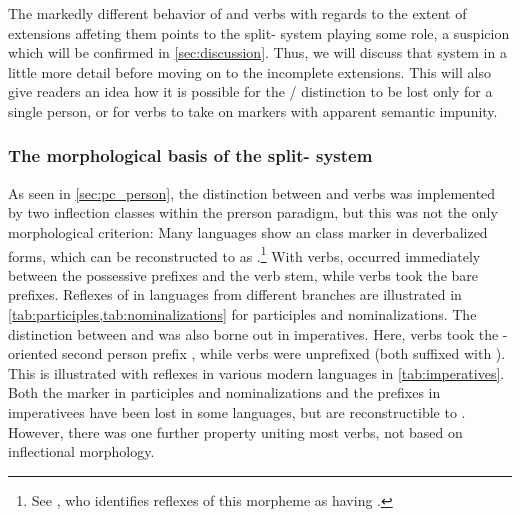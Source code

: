 The markedly different behavior of  and  verbs with regards to the extent of extensions affeting them points to the split- system playing some role, a suspicion which will be confirmed in \cref{sec:discussion}.
Thus, we will discuss that system in a little more detail before moving on to the incomplete extensions.
This will also give readers an idea how it is possible for the / distinction to be lost only for a single person, or for  verbs to take on  markers with apparent semantic impunity.



\subsubsection{The morphological basis of the split- system}
\label{sec:split}
As seen in \cref{sec:pc_person}, the \PC distinction between  and  verbs was implemented by two inflection classes within the \setone prerson paradigm, but this was not the only morphological criterion:
%
Many languages show an  class marker in deverbalized forms, which can be reconstructed to \PC as .\footnote{See \textcite[227]{meira2000split}, who identifies reflexes of this morpheme as having .}
With  verbs,  occurred immediately between the possessive prefixes and the verb stem, while  verbs took the bare prefixes.
Reflexes of  in languages from different branches are illustrated in \cref{tab:participles,tab:nominalizations} for participles and nominalizations.%
%
%
%
%
%
The distinction between  and  was also borne out in imperatives.
Here,  verbs took the -oriented second person prefix , while  verbs were unprefixed (both suffixed with ).
This is illustrated with reflexes in various modern languages in \cref{tab:imperatives}.
Both the  marker  in participles and nominalizations and the prefixes in imperativees have been lost in some languages, but are reconstructible to \PC.
However, there was one further property uniting most  verbs, not based on inflectional morphology.

